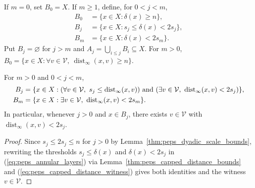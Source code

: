 \begin{definition}
    \label{def:peps_annular_layers}
    \leanok
    If $m=0$, set $B_0=X$. If $m\ge1$, define, for $0<j<m$,
    \begin{align}
        B_0 & =\{x\in X:\delta(x)\ge n\},       \\
        B_j & =\{x\in X:s_j\le\delta(x)<2s_j\}, \\
        B_m & =\{x\in X:\delta(x)<2s_m\}.
        \label{eq:peps_annular_layers}
    \end{align}
    Put $B_j=\varnothing$ for $j>m$ and $A_j=\bigcup_{i\le j}B_i\subseteq X$.
    For $m>0$, $B_0=\{x\in X:\forall v\in\mathcal V,\ \operatorname{dist}_{\infty}(x,v)\ge n\}$.
\end{definition}

\begin{lemma}
    \label{thm:peps_annular_mark_witness}
    \leanok
    For $m>0$ and $0<j<m$,
    \begin{align}
        B_j & =\{x\in X:(\forall v\in\mathcal V,\ s_j\le\operatorname{dist}_{\infty}(x,v))
        \ \text{and}\ (\exists v\in\mathcal V,\ \operatorname{dist}_{\infty}(x,v)<2s_j)\}, \notag \\
        B_m & =\{x\in X:\exists v\in\mathcal V,\ \operatorname{dist}_{\infty}(x,v)<2s_m\}. \notag
    \end{align}
    In particular, whenever $j>0$ and $x\in B_j$, there exists
    $v\in\mathcal V$ with $\operatorname{dist}_{\infty}(x,v)<2s_j$.
\end{lemma}
\begin{proof}
    \leanok
    Since $s_j\le 2s_j\le n$ for $j>0$ by Lemma~\ref{thm:peps_dyadic_scale_bounds},
    rewriting the thresholds $s_j\le\delta(x)$ and $\delta(x)<2s_j$ in
    (\ref{eq:peps_annular_layers}) via Lemma~\ref{thm:peps_capped_distance_bounds}
    and (\ref{eq:peps_capped_distance_witness}) gives both identities and the
    witness $v\in\mathcal V$.
\end{proof}

